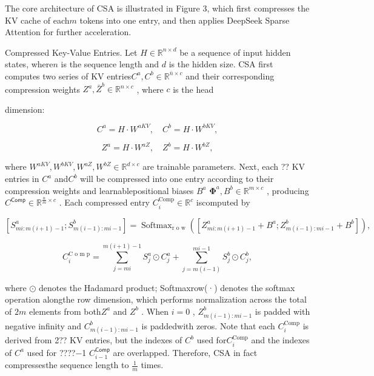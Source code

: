 \documentclass[
  10
]{article}
\begin{document}
The core architecture of CSA is illustrated in Figure 3, which first
compresses the KV cache of each\(m\) tokens into one entry, and then
applies DeepSeek Sparse Attention for further acceleration.

Compressed Key-Value Entries. Let
\(H \in \mathbb { R } ^ { n \times d }\) be a sequence of input hidden
states, where\(n\) is the sequence length and \(d\) is the hidden size.
CSA first computes two series of KV
entries\(C ^ { a } , C ^ { b } \in \mathbb { R } ^ { \bar { n } \times c }\)
and their corresponding compression weights
\(Z ^ { a } , { \bar { Z } } ^ { b } \in \mathbb { R } ^ { n \times c }\)
, where \(c\) is the head

dimension:

\[
C ^ {a} = H \cdot W ^ {a K V}, \quad C ^ {b} = H \cdot W ^ {b K V}, \tag {9}
\]

\[
Z ^ {a} = H \cdot W ^ {a Z}, \quad Z ^ {b} = H \cdot W ^ {b Z}, \tag {10}
\]

where
\(W ^ { a K V } , W ^ { b K V } , W ^ { a Z } , W ^ { b Z } \in \mathbb { R } ^ { d \times c }\)
are trainable parameters. Next, each ?? KV entries in \(C ^ { a }\)
and\(C ^ { b }\) will be compressed into one entry according to their
compression weights and learnablepositional biases \(B ^ { a }\)
\(\mathbf { \Phi } ^ { a } , B ^ { b } \in \mathbb { R } ^ { m \times c }\)
, producing
\(C ^ { \mathsf { C o m p } } \in \mathbb { R } ^ { \frac { n } { m } \times c }\)
. Each compressed entry
\(C _ { i } ^ { \mathrm { C o m p } } \in \mathbb { R } ^ { c }\)
iscomputed by

\[
\left[ S _ {m i: m (i + 1) - 1} ^ {a}; S _ {m (i - 1): m i - 1} ^ {b} \right] = \operatorname {S o f t m a x} _ {\text {r o w}} \left(\left[ Z _ {m i: m (i + 1) - 1} ^ {a} + B ^ {a}; Z _ {m (i - 1): m i - 1} ^ {b} + B ^ {b} \right]\right), \tag {11}
\]

\[
C _ {i} ^ {\text {C o m p}} = \sum_ {j = m i} ^ {m (i + 1) - 1} S _ {j} ^ {a} \odot C _ {j} ^ {a} + \sum_ {j = m (i - 1)} ^ {m i - 1} S _ {j} ^ {b} \odot C _ {j} ^ {b}, \tag {12}
\]

where \(\odot\) denotes the Hadamard product; Softmaxrow(·) denotes the
softmax operation alongthe row dimension, which performs normalization
across the total of \(2 m\) elements from both\(Z ^ { a }\) and
\(Z ^ { b }\) . When \(i = 0\) ,
\(Z _ { m ( i - 1 ) : m i - 1 } ^ { b }\) is padded with negative
infinity and \(C _ { m ( i - 1 ) : m i - 1 } ^ { b }\) is paddedwith
zeros. Note that each \(C _ { i } ^ { \mathrm { C o m p } }\) is derived
from 2?? KV entries, but the indexes of \(C ^ { b }\) used
for\(C _ { i } ^ { \mathrm { C o m p } }\) and the indexes of
\(C ^ { a }\) used for ????−1
\(C _ { i - 1 } ^ { \mathsf { C o m p } }\) are overlapped. Therefore,
CSA in fact compressesthe sequence length to \(\frac { 1 } { m }\)
times.
\end{document}
